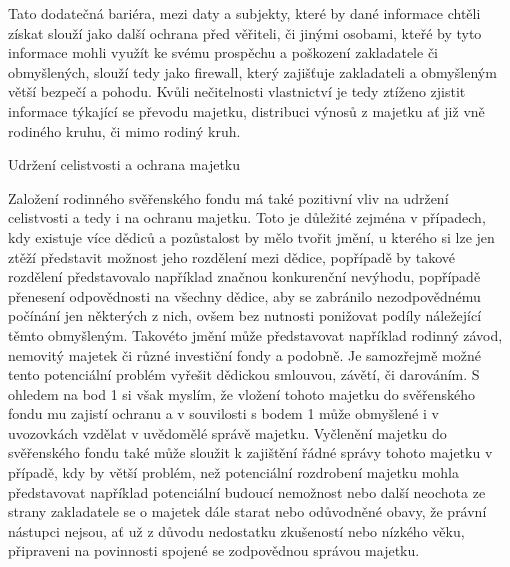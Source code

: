 \documentclass{article}
\begin{document}
 Tato dodatečná bariéra, mezi daty a subjekty, které by dané informace chtěli získat slouží jako další ochrana před věřiteli, či jinými osobami, kteřé by tyto informace mohli využít ke svému prospěchu a poškození zakladatele či obmyšlených, slouží tedy jako firewall, který zajišťuje zakladateli a obmyšleným větší bezpečí a pohodu. Kvůli nečitelnosti vlastnictví je tedy ztíženo zjistit informace týkající se převodu majetku, distribuci výnosů z majetku ať již vně rodiného kruhu, či mimo rodiný kruh.\\
 
 
 
 \newpage
 \thispagestyle{smallertextinheader}
 
  \begin{enumerate}
 {\Large\item[4.] Udržení celistvosti a ochrana majetku}
 \end{enumerate}
 
 Založení rodinného svěřenského fondu má také pozitivní vliv na udržení celistvosti a tedy i na ochranu majetku. Toto je důležité zejména v případech, kdy existuje více dědiců a pozůstalost by mělo tvořit jmění, u kterého si lze jen ztěží představit možnost jeho rozdělení mezi dědice, popřípadě by takové rozdělení představovalo například značnou konkurenční nevýhodu, popřípadě přenesení odpovědnosti na všechny dědice, aby se zabránilo nezodpovědnému počínání jen některých z nich, ovšem bez nutnosti ponižovat podíly náležející těmto obmyšleným. Takovéto jmění může představovat například rodinný závod, nemovitý majetek či různé investiční fondy a podobně. Je samozřejmě možné tento potenciální problém vyřešit dědickou smlouvou, závětí, či darováním. S ohledem na bod 1 si však myslím, že vložení tohoto majetku do svěřenského fondu mu zajistí ochranu a v souvilosti s bodem 1 může obmyšlené i v uvozovkách vzdělat v uvědomělé správě majetku. Vyčlenění majetku do svěřenského fondu také může sloužit k zajištění řádné správy tohoto majetku v případě, kdy by větší problém, než potenciální rozdrobení majetku mohla představovat například potenciální budoucí nemožnost nebo další neochota ze strany zakladatele se o majetek dále starat nebo odůvodněné obavy, že právní nástupci nejsou, ať už z důvodu nedostatku zkušeností nebo nízkého věku, připraveni na povinnosti spojené se zodpovědnou správou majetku.\\
 
\end{document}

